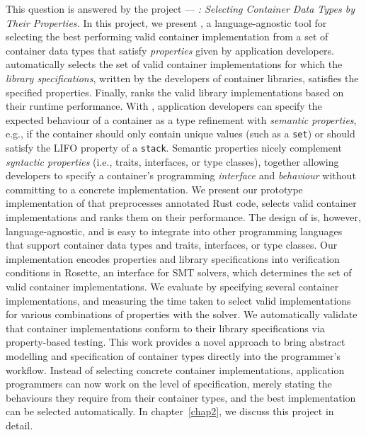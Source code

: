 This question is answered by the project --- \emph{\Primrose{}: Selecting Container Data Types by Their Properties.}
In this project, we present \Primrose{}, a language-agnostic tool for selecting the best performing valid container implementation from a set of container data types that satisfy \emph{properties} given by application developers.
\Primrose{} automatically selects the set of valid container implementations for which the \emph{library specifications}, written by the developers of container libraries, satisfies the specified properties.
Finally, \Primrose{} ranks the valid library implementations based on their runtime performance.
With \Primrose{}, application developers can specify the expected behaviour of a container as a type refinement with \emph{semantic properties}, e.g., if the container should only contain unique values (such as a \lstinline{set}) or should satisfy the LIFO property of a \lstinline{stack}.
Semantic properties nicely complement \emph{syntactic properties} (i.e., traits, interfaces, or type classes), together allowing developers to specify a container's programming \emph{interface} and \emph{behaviour} without committing to a concrete implementation.
We present our prototype implementation of \Primrose{} that preprocesses annotated Rust code, selects valid container implementations and ranks them on their performance. The design of \Primrose{} is, however, language-agnostic, and is easy to integrate into other programming languages that support container data types and traits, interfaces, or type classes. Our implementation encodes properties and library specifications into verification conditions in Rosette, an interface for SMT solvers, which determines the set of valid container implementations. We evaluate \Primrose{} by specifying several container implementations, and measuring the time taken to select valid implementations for various combinations of properties with the solver. We automatically validate that container implementations conform to their library specifications via property-based testing.
This work provides a novel approach to bring abstract modelling and specification of container types directly into the programmer's workflow.
Instead of selecting concrete container implementations, application programmers can now work on the level of specification, merely stating the behaviours they require from their container types, and the best implementation can be selected automatically. In chapter~\ref{chap2}, we discuss this project in detail.

\begin{center}
\vspace{-0.7em}
\vspace{-0.3em}
\end{center}

